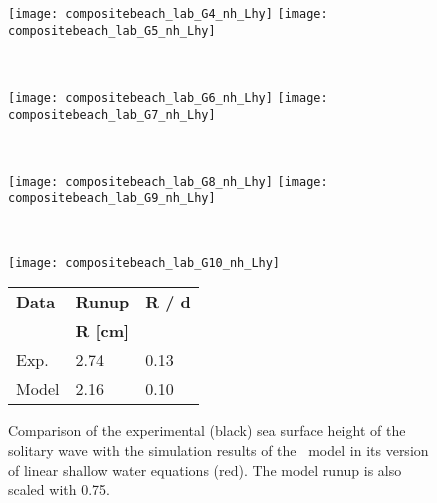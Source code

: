 \begin{figure}[htbp]
\begin{minipage}{\textwidth}
\texttt{[image: compositebeach\_lab\_G4\_nh\_Lhy]}
\texttt{[image: compositebeach\_lab\_G5\_nh\_Lhy]}
\end{minipage} \\
\begin{minipage}{\textwidth}
\texttt{[image: compositebeach\_lab\_G6\_nh\_Lhy]}
\texttt{[image: compositebeach\_lab\_G7\_nh\_Lhy]}
\end{minipage} \\
\begin{minipage}{\textwidth}
\texttt{[image: compositebeach\_lab\_G8\_nh\_Lhy]}
\texttt{[image: compositebeach\_lab\_G9\_nh\_Lhy]}
\end{minipage} \\
\begin{minipage}{0.48\textwidth}
\texttt{[image: compositebeach\_lab\_G10\_nh\_Lhy]}
\end{minipage} 
\qquad 
\begin{minipage}{0.45\textwidth}
\begin{tabular}{lll}
\textbf{Data} & \textbf{Runup} & \textbf{R / d} \\
              & \textbf{R [cm]} &  \\
\toprule
Exp.  &  2.74   &  0.13 \\
Model &  2.16   &  0.10 \\
\end{tabular}
\end{minipage}
\caption{Comparison of the experimental (black) sea surface height of the
solitary wave with the simulation results of the \nh\ model in its version of linear shallow water equations (red). The model runup is also scaled with 0.75.}
\label{fig:nh_compositebeach_lab_nh_Lhy}
\end{figure}
